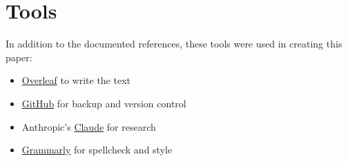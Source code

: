 %
%

\pagebreak
\section{Tools}

\onehalfspacing

In addition to the documented references, these tools were used in creating this paper:

\begin{itemize}
    \item \href{http://www.overleaf.com}{Overleaf} to write the text
    \item \href{https://github.com/chfrank-cgn}{GitHub} for backup and version control
    \item Anthropic's \href{https://www.anthropic.com/claude}{Claude} for research
    \item \href{https://app.grammarly.com/}{Grammarly} for spellcheck and style
\end{itemize}

